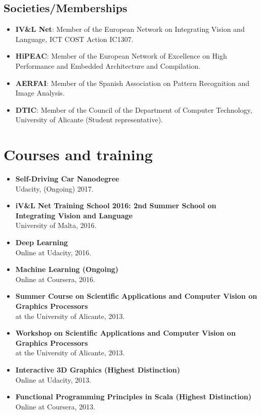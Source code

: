 \documentclass[8pt]{article}
\begin{document}
\subsection*{Societies/Memberships}

\begin{itemize}
	\item \textbf{IV\&L Net}: Member of the European Network on Integrating Vision and Language, ICT COST Action IC1307.
	\item \textbf{HiPEAC}: Member of the European Network of Excellence on High Performance and Embedded Architecture and Compilation.
	\item \textbf{AERFAI}: Member of the Spanish Association on Pattern Recognition and Image Analysis.
	\item \textbf{DTIC}: Member of the Council of the Department of Computer Technology, University of Alicante (Student representative).
\end{itemize}


\section*{Courses and training}

\begin{itemize}
	\item \textbf{Self-Driving Car Nanodegree}\\ Udacity, (Ongoing) 2017.
	\item \textbf{iV\&L Net Training School 2016: 2nd Summer School on Integrating Vision and Language}\\ University of Malta, 2016.
	\item \textbf{Deep Learning}\\ Online at Udacity, 2016.
	\item \textbf{Machine Learning (Ongoing)}\\ Online at Coursera, 2016.
	\item \textbf{Summer Course on Scientific Applications and Computer Vision on Graphics Processors}\\ at the University of Alicante, 2013.
	\item \textbf{Workshop on Scientific Applications and Computer Vision on Graphics Processors}\\ at the University of Alicante, 2013.	
	\item \textbf{Interactive 3D Graphics (Highest Distinction)}\\
	Online at Udacity, 2013.
	\item \textbf{Functional Programming Principles in Scala (Highest Distinction)}\\
	Online at Coursera, 2013.
\end{itemize}
\end{document}
